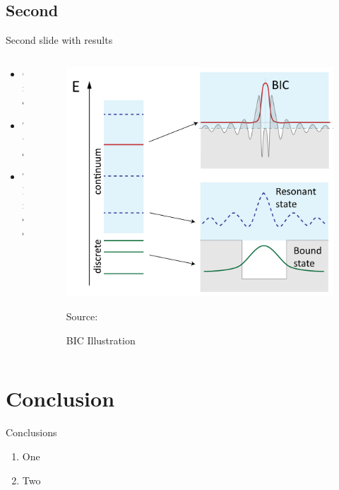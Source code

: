 \documentclass[
aspectratio=169,
16pt,
xcolor={dvipsnames} %
]{beamer}
\begin{document}
\subsection{Second}
\begin{frame}[t]{Second slide with results}
	\begin{columns}
		\begin{column}{0.4\linewidth}
			\begin{itemize}
				\item One
				\item Two
				\item Three				
			\end{itemize}
		\end{column}
		\begin{column}{0.4\linewidth}
			\begin{figure}
				\includegraphics[width=0.9\linewidth]{fig/bicwiki0}
				\caption{BIC Illustration}
				 {\raggedright\tiny Source:\par}
			\end{figure}
		\end{column}
	\end{columns}
\end{frame}

\section{Conclusion}
\begin{frame}[t]{Conclusions}
	\begin{enumerate}
		\item One
		\item Two
	\end{enumerate}
\end{frame}
\end{document}

